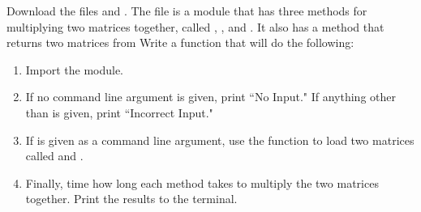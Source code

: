 \begin{problem}

Download the files  and .
The file  is a module that has three methods for multiplying two matrices together, called , , and .
It also has a  method that returns two matrices from 
Write a function that will do the following:
\begin{enumerate}
\item Import the  module.
\item If no command line argument is given, print ``No Input."  If anything other than  is given, print ``Incorrect Input."
\item If  is given as a command line argument, use the  function to load two matrices called  and .
\item Finally, time how long each method takes to multiply the two matrices together. Print the results to the terminal.
\end{enumerate}
\end{problem}


